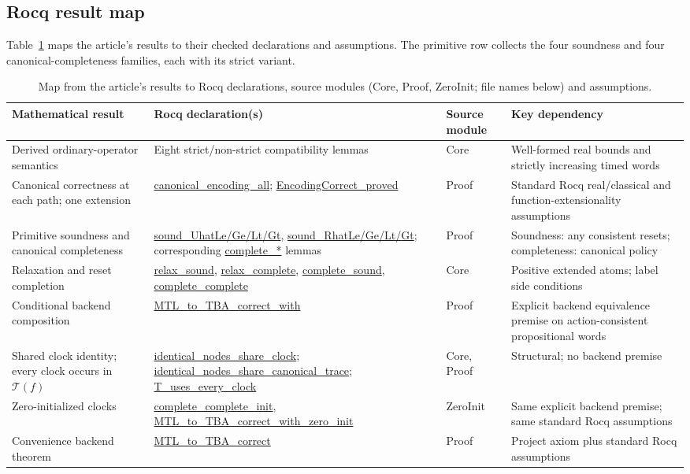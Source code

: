 \documentclass{ieeeaccess}
\newcommand{\T}{\mathcal{T}}
\newcommand{\Rocqid}[1]{\url{#1}}
\begin{document}
\subsection{Rocq result map}
\label{subsec:rocq-result-map}
Table~\ref{tab:rocq-result-map} maps the article's results to their checked
declarations and assumptions. The primitive row collects the four soundness
and four canonical-completeness families, each with its strict variant.
\begin{table}[t]
\centering
\caption{Map from the article's results to Rocq declarations, source modules
(Core, Proof, ZeroInit; file names below) and assumptions.}
\label{tab:rocq-result-map}
\begin{tabular}{@{}p{}p{}p{}p{}@{}}
\toprule
Mathematical result & Rocq declaration(s) & Source module & Key dependency\\
\midrule
Derived ordinary-operator semantics &
Eight strict/non-strict compatibility lemmas &
Core &
Well-formed real bounds and strictly increasing timed words\\
Canonical correctness at each path; one extension &
\Rocqid{canonical_encoding_all};
\Rocqid{EncodingCorrect_proved} &
Proof &
Standard Rocq real/classical and function-extensionality assumptions\\
Primitive soundness and canonical completeness &
\Rocqid{sound_UhatLe/Ge/Lt/Gt},
\Rocqid{sound_RhatLe/Ge/Lt/Gt};
corresponding \Rocqid{complete_*} lemmas &
Proof &
Soundness: any consistent resets; completeness: canonical policy\\
Relaxation and reset completion &
\Rocqid{relax_sound}, \Rocqid{relax_complete},
\Rocqid{complete_sound}, \Rocqid{complete_complete} &
Core &
Positive extended atoms; label side conditions\\
Conditional backend composition &
\Rocqid{MTL_to_TBA_correct_with} &
Proof &
Explicit backend equivalence premise on action-consistent propositional words\\
Shared clock identity; every clock occurs in $\T(f)$ &
\Rocqid{identical_nodes_share_clock};
\Rocqid{identical_nodes_share_canonical_trace};
\Rocqid{T_uses_every_clock} &
Core, Proof &
Structural; no backend premise\\
Zero-initialized clocks &
\Rocqid{complete_complete_init}, \Rocqid{MTL_to_TBA_correct_with_zero_init} &
ZeroInit &
Same explicit backend premise; same standard Rocq assumptions\\
Convenience backend theorem &
\Rocqid{MTL_to_TBA_correct} &
Proof &
Project axiom plus standard Rocq assumptions\\
\bottomrule
\end{tabular}
\end{table}
\end{document}
